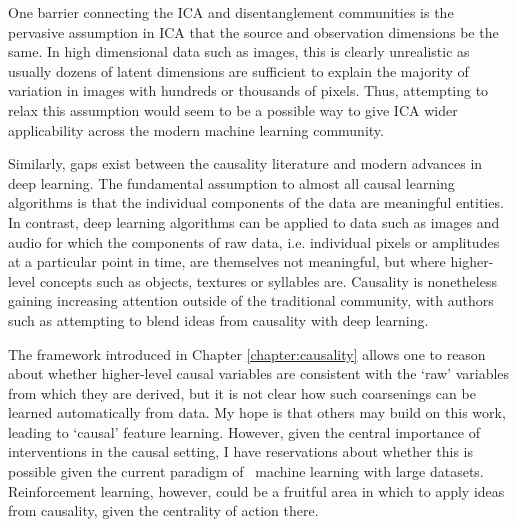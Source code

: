One barrier connecting the ICA and disentanglement communities is the pervasive assumption in ICA that the source and observation dimensions be the same.
In high dimensional data such as images, this is clearly unrealistic as usually dozens of latent dimensions are sufficient to explain the majority of variation in images with hundreds or thousands of pixels. 
Thus, attempting to relax this assumption would seem to be a possible way to give ICA wider applicability across the modern machine learning community.


Similarly, gaps exist between the causality literature and modern advances in deep learning.
The fundamental assumption to almost all causal learning algorithms is that the individual components of the data are meaningful entities. 
In contrast, deep learning algorithms can be applied to data such as images and audio for which the components of raw data, i.e. individual pixels or amplitudes at a particular point in time, are themselves not meaningful, but where higher-level concepts such as objects, textures or syllables are.
Causality is nonetheless gaining increasing attention outside of the traditional community, with authors such as \cite{bengio2019meta} attempting to blend ideas from causality with deep learning.

The framework introduced in Chapter \ref{chapter:causality} allows one to reason about whether higher-level causal variables are consistent with the `raw' variables from which they are derived, but it is not clear how such coarsenings can be learned automatically from data.
My hope is that others may build on this work, leading to `causal' feature learning.
However, given the central importance of interventions in the causal setting, I have reservations about whether this is possible given the current paradigm of \iid~machine learning with large datasets.
Reinforcement learning, however, could be a fruitful area in which to apply ideas from causality, given the centrality of action there.




